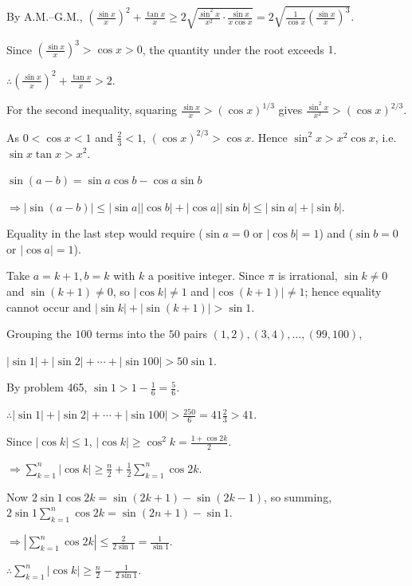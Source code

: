   By A.M.--G.M., $\left(\frac{\sin x}{x}\right)^2 + \frac{\tan x}{x}\geq 2\sqrt{\frac{\sin^2x}{x^2}\cdot\frac{\sin
      x}{x\cos x}} = 2\sqrt{\frac{1}{\cos x}\left(\frac{\sin x}{x}\right)^3}$.

  Since $\left(\frac{\sin x}{x}\right)^3 > \cos x > 0$, the quantity under the root exceeds $1$.

  $\therefore\left(\frac{\sin x}{x}\right)^2 + \frac{\tan x}{x} > 2$.

  For the second inequality, squaring $\frac{\sin x}{x} > (\cos x)^{1/3}$ gives $\frac{\sin^2x}{x^2} > (\cos
  x)^{2/3}$.

  As $0 < \cos x < 1$ and $\frac{2}{3} < 1$, $(\cos x)^{2/3} > \cos x$. Hence $\sin^2x > x^2\cos x$, i.e.\
  $\sin x\tan x > x^2$.
\item $\sin(a - b) = \sin a\cos b - \cos a\sin b$

  $\Rightarrow|\sin(a - b)|\leq|\sin a||\cos b| + |\cos a||\sin b|\leq|\sin a| + |\sin b|$.

  Equality in the last step would require ($\sin a = 0$ or $|\cos b| = 1$) and ($\sin b = 0$ or $|\cos a| =
  1$).

  Take $a = k + 1, b = k$ with $k$ a positive integer. Since $\pi$ is irrational, $\sin k\neq 0$ and $\sin(k +
  1)\neq 0$, so $|\cos k|\neq 1$ and $|\cos(k + 1)|\neq 1$; hence equality cannot occur and $|\sin k| +
  |\sin(k + 1)| > \sin1$.

  Grouping the $100$ terms into the $50$ pairs $(1, 2), (3, 4), \ldots, (99, 100)$,

  $|\sin1| + |\sin2| + \cdots + |\sin100| > 50\sin1$.

  By problem 465, $\sin1 > 1 - \frac{1}{6} = \frac{5}{6}$.

  $\therefore|\sin1| + |\sin2| + \cdots + |\sin100| > \frac{250}{6} = 41\frac{2}{3} > 41$.
\item Since $|\cos k|\leq 1$, $|\cos k|\geq\cos^2k = \frac{1 + \cos2k}{2}$.

  $\Rightarrow\displaystyle\sum_{k = 1}^n|\cos k|\geq\frac{n}{2} + \frac{1}{2}\sum_{k = 1}^n\cos2k$.

  Now $2\sin1\cos2k = \sin(2k + 1) - \sin(2k - 1)$, so summing, $2\sin1\displaystyle\sum_{k = 1}^n\cos2k
  = \sin(2n + 1) - \sin1$.

  $\Rightarrow\left|\displaystyle\sum_{k = 1}^n\cos2k\right|\leq\frac{2}{2\sin1} = \frac{1}{\sin1}$.

  $\therefore\displaystyle\sum_{k = 1}^n|\cos k|\geq\frac{n}{2} - \frac{1}{2\sin1}$.

